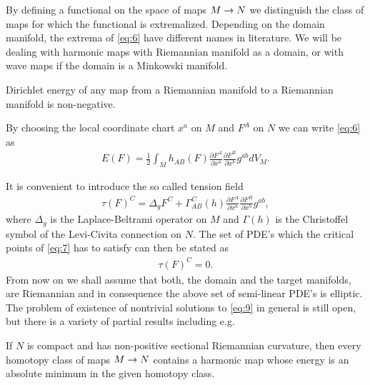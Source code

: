 By defining a functional on the space of maps $M\rightarrow N$ we distinguish
the class of maps for which the functional is extremalized. Depending
on the domain manifold, the extrema of \eqref{eq:6} have
different names in literature. We will be dealing with harmonic maps
with Riemannian manifold as a domain, or with wave maps if the domain
is a Minkowski manifold.



\begin{remark}
  Dirichlet energy of any map from a Riemannian manifold to a
  Riemannian manifold is non-negative.
\end{remark}

By choosing the local coordinate chart $x^a$ on $M$ and $F^A$ on $N$
we can write \eqref{eq:6} as
\begin{align}
  \label{eq:7}
  E(F)=\frac{1}{2}\int_M h_{AB}(F)\frac{\partial F^A}{\partial
    x^a}\frac{\partial F^B}{\partial x^b}g^{ab}dV_M.
\end{align}

It is convenient to introduce the so called tension field
\begin{align}
  \label{eq:8}
  \tau(F)^C=\Delta_g F^C+\Gamma_{AB}^{C}(h)\frac{\partial
    F^A}{\partial x^a}\frac{\partial F^B}{\partial x^b}g^{ab},
\end{align}
where $\Delta_g$ is the Laplace-Beltrami operator on $M$ and
$\Gamma(h)$ is the Christoffel symbol of the Levi-Civita
connection on $N$. The set of PDE's which the critical points of
\eqref{eq:7} has to satisfy can then be stated as
\begin{align}
  \label{eq:9}
  \tau(F)^C=0.
\end{align}
From now on we shall assume that both, the domain and the target
manifolds, are Riemannian and in consequence the above
set of semi-linear PDE's is elliptic.\\

The problem of existence of nontrivial solutions to \eqref{eq:9} in
general is still open, but there is a variety of partial results
including e.g.

\begin{theorem}\label{thm:Eells-Sampson}
  If $N$ is compact and has non-positive sectional Riemannian
  curvature, then every homotopy class of maps $M\rightarrow N$ contains a
  harmonic map whose energy is an absolute minimum in the given
  homotopy class.
\end{theorem}

